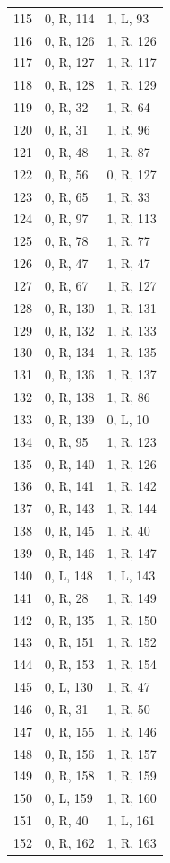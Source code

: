 \begin{longtable}{@{}rll@{}}
115 & 0, R, 114 & 1, L, 93\\
116 & 0, R, 126 & 1, R, 126\\
117 & 0, R, 127 & 1, R, 117\\
118 & 0, R, 128 & 1, R, 129\\
119 & 0, R, 32 & 1, R, 64\\
120 & 0, R, 31 & 1, R, 96\\
121 & 0, R, 48 & 1, R, 87\\
122 & 0, R, 56 & 0, R, 127\\
123 & 0, R, 65 & 1, R, 33\\
124 & 0, R, 97 & 1, R, 113\\
125 & 0, R, 78 & 1, R, 77\\
126 & 0, R, 47 & 1, R, 47\\
127 & 0, R, 67 & 1, R, 127\\
128 & 0, R, 130 & 1, R, 131\\
129 & 0, R, 132 & 1, R, 133\\
130 & 0, R, 134 & 1, R, 135\\
131 & 0, R, 136 & 1, R, 137\\
132 & 0, R, 138 & 1, R, 86\\
133 & 0, R, 139 & 0, L, 10\\
134 & 0, R, 95 & 1, R, 123\\
135 & 0, R, 140 & 1, R, 126\\
136 & 0, R, 141 & 1, R, 142\\
137 & 0, R, 143 & 1, R, 144\\
138 & 0, R, 145 & 1, R, 40\\
139 & 0, R, 146 & 1, R, 147\\
140 & 0, L, 148 & 1, L, 143\\
141 & 0, R, 28 & 1, R, 149\\
142 & 0, R, 135 & 1, R, 150\\
143 & 0, R, 151 & 1, R, 152\\
144 & 0, R, 153 & 1, R, 154\\
145 & 0, L, 130 & 1, R, 47\\
146 & 0, R, 31 & 1, R, 50\\
147 & 0, R, 155 & 1, R, 146\\
148 & 0, R, 156 & 1, R, 157\\
149 & 0, R, 158 & 1, R, 159\\
150 & 0, L, 159 & 1, R, 160\\
151 & 0, R, 40 & 1, L, 161\\
152 & 0, R, 162 & 1, R, 163\\

\end{longtable}
